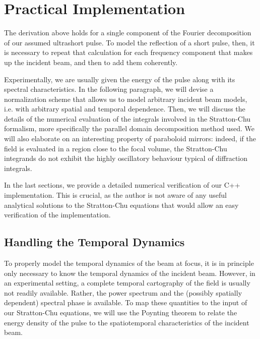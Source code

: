 \documentclass[11pt,SymmetricalJury]{inrsthesis/inrsthesis}
\begin{document}
\section{Practical Implementation}

The derivation above holds for a single component of the Fourier decomposition
of our assumed ultrashort pulse. To model the reflection of a short pulse, then,
it is necessary to repeat that calculation for each frequency component that
makes up the incident beam, and then to add them coherently.

Experimentally, we are usually given the energy of the pulse along
with its spectral characteristics. In the following paragraph, we will devise
a normalization scheme that allows us to model arbitrary incident beam models,
i.e. with arbitrary spatial and temporal dependence. Then, we will discuss
the details of the numerical evaluation of the integrals involved in the
Stratton-Chu formalism, more specifically the parallel domain decomposition
method used. We will also elaborate on an interesting property of paraboloid
mirrors: indeed, if the field is evaluated in a region close to the focal volume,
the Stratton-Chu integrands do not exhibit the highly oscillatory behaviour
typical of diffraction integrals.

In the last sections, we provide a detailed numerical verification of our
C++ implementation. This is crucial, as the author is not aware of any useful
analytical solutions to the Stratton-Chu equations that would allow an easy
verification of the implementation.


\subsection{Handling the Temporal Dynamics}

To properly model the temporal dynamics of the beam at focus, it is in principle
only necessary to know the temporal dynamics of the incident beam. However, in
an experimental setting, a complete temporal cartography of the field is usually
not readily available. Rather, the power spectrum and the (possibly spatially
dependent) spectral phase is available. To map these quantities to the input
of our Stratton-Chu equations, we will use the Poynting theorem to relate
the energy density of the pulse to the spatiotemporal characteristics of the
incident beam.
\end{document}
